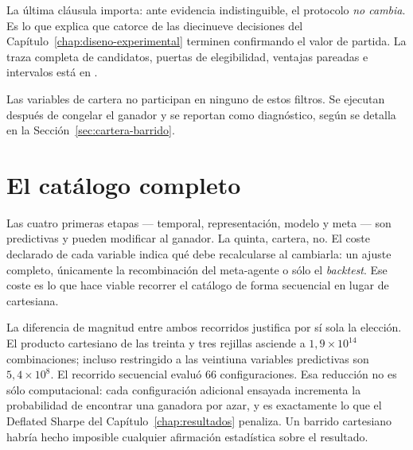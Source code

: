 La última cláusula importa: ante evidencia indistinguible, el protocolo \emph{no cambia}. Es lo que
explica que catorce de las diecinueve decisiones del Capítulo~\ref{chap:diseno-experimental}
terminen confirmando el valor de partida. La traza completa de candidatos, puertas de elegibilidad,
ventajas pareadas e intervalos está en .

Las variables de cartera no participan en ninguno de estos filtros. Se ejecutan después de congelar
el ganador y se reportan como diagnóstico, según se detalla en la
Sección~\ref{sec:cartera-barrido}.

\section{El catálogo completo}

\begin{landscape}

\end{landscape}

Las cuatro primeras etapas --- temporal, representación, modelo y meta --- son predictivas y pueden
modificar al ganador. La quinta, cartera, no. El coste declarado de cada variable indica qué debe
recalcularse al cambiarla: un ajuste completo, únicamente la recombinación del meta-agente o sólo el
\textit{backtest}. Ese coste es lo que hace viable recorrer el catálogo de forma secuencial en lugar
de cartesiana.

La diferencia de magnitud entre ambos recorridos justifica por sí sola la elección. El producto
cartesiano de las treinta y tres rejillas asciende a $1{,}9 \times 10^{14}$ combinaciones; incluso
restringido a las veintiuna variables predictivas son $5{,}4 \times 10^{8}$. El recorrido secuencial
evaluó 66 configuraciones. Esa reducción no es sólo computacional: cada configuración adicional
ensayada incrementa la probabilidad de encontrar una ganadora por azar, y es exactamente lo que el
Deflated Sharpe del Capítulo~\ref{chap:resultados} penaliza. Un barrido cartesiano habría hecho
imposible cualquier afirmación estadística sobre el resultado.
